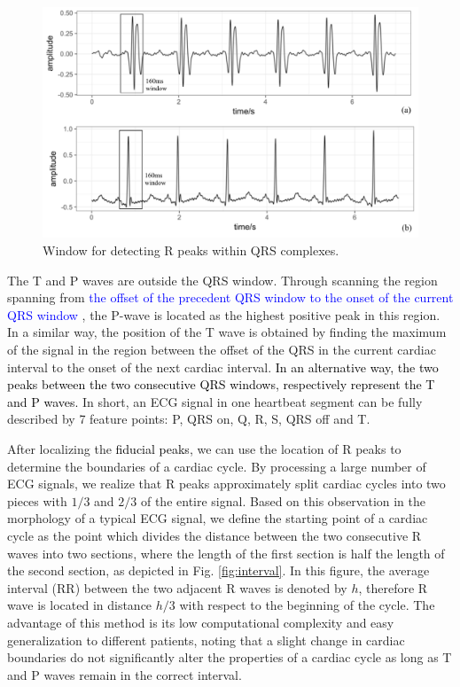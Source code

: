 \begin{figure}[t]
\centering
\includegraphics[scale=.5]{Fig/window.pdf}
\caption{Window for detecting R peaks within QRS complexes.}
\label{fig:window}
\end{figure}


The T and P waves are outside the QRS window. Through scanning the region spanning from \textcolor{blue}{the offset of the precedent QRS window to the onset of the current QRS window}%
, the P-wave is located as the highest positive peak in this region. In a similar way, the position of the T wave is obtained by finding the maximum of the signal in the region between the offset of the QRS in the current cardiac interval to the onset of the next cardiac interval. \textcolor{black}{In an alternative way, the two peaks between the two consecutive QRS windows, respectively represent the T and P waves.}
In short, an ECG signal in one heartbeat segment can be fully described by 7 feature points: P, QRS on, Q, R, S, QRS off and T. 

After localizing the \textcolor{black}{fiducial peaks}, we can use the location of R peaks to determine the boundaries of a cardiac cycle. %
By processing a large number of ECG signals, we realize that R peaks approximately split cardiac cycles into two pieces with $1/3$ and $2/3$ of the entire signal\cite{2012qrs}. %
Based on this observation in the morphology of a typical ECG signal, we define the starting point of a cardiac cycle as the point which divides the distance between the two consecutive R waves into two sections, where the length of the first section is half the length of the second section, as depicted in Fig. \ref{fig:interval}. In this figure, the average interval (RR) between the two adjacent R waves is denoted by $h$, therefore R wave is located in distance $h/3$ with respect to the beginning of the cycle. The advantage of this method is its low computational complexity and easy generalization to different patients, noting that a slight change in cardiac boundaries do not significantly alter the properties of a cardiac cycle as long as T and P waves remain in the correct interval. 

